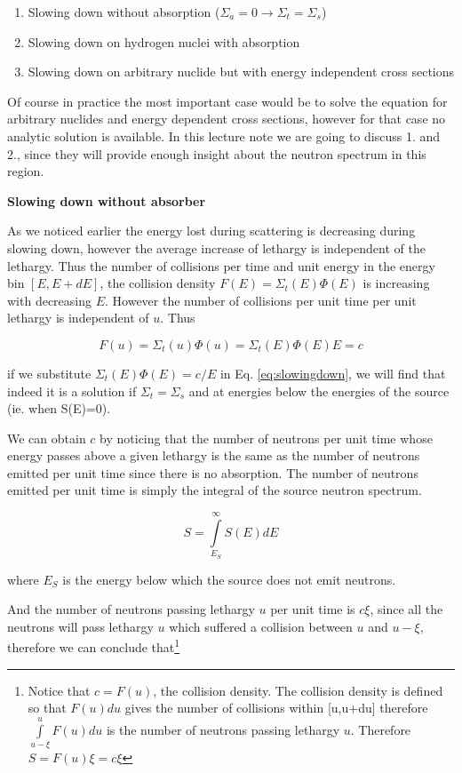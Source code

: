 \begin{enumerate}
\item Slowing down without absorption ($\Sigma_a=0 \rightarrow \Sigma_t=\Sigma_s$)
\item Slowing down on hydrogen nuclei with absorption
\item Slowing down on arbitrary nuclide but with energy independent cross sections
\end{enumerate}

Of course in practice the most important case would be to solve the equation for arbitrary nuclides and energy dependent cross sections, however for that case no analytic solution is available. In this lecture note we are going to discuss 1. and 2., since they will provide enough insight about the neutron spectrum in this region.

\vspace{0.5cm}

\textbf{Slowing down without absorber}

As we noticed earlier the energy lost during scattering is decreasing during slowing down, however the average increase of lethargy is independent of the lethargy. Thus the number of collisions per time and unit energy in the energy bin $[E,E+dE]$, the collision density $F(E)=\Sigma_t(E)\Phi(E)$ is increasing with decreasing $E$. However the number of collisions per unit time per unit lethargy is independent of $u$. Thus

$$F(u)=\Sigma_t(u)\Phi(u)=\Sigma_t(E)\Phi(E)E=c$$

\noindent if we substitute $\Sigma_t(E)\Phi(E)=c/E$ in Eq. \eqref{eq:slowingdown}, we will find that indeed it is a solution if $\Sigma_t=\Sigma_s$ and at energies below the energies of the source (ie. when S(E)=0).

We can obtain $c$ by noticing that the number of neutrons per unit time whose energy passes above a given lethargy is the same as the number of neutrons emitted per unit time since there is no absorption. The number of neutrons emitted per unit time is simply the integral of the source neutron spectrum.

$$S=\int\limits_{E_S}^\infty S(E)dE$$

\noindent where $E_S$ is the energy below which the source does not emit neutrons. 

And the number of neutrons passing lethargy $u$ per unit time is $c\xi$, since all the neutrons will pass lethargy $u$ which suffered a collision between $u$ and $u-\xi$, therefore we can conclude that\footnote{Notice that $c=F(u)$, the collision density. The collision density is defined so that $F(u)du$ gives the number of collisions within [u,u+du] therefore $\int\limits_{u-\xi}^u F(u)du$ is the number of neutrons passing lethargy $u$. Therefore $S=F(u)\xi=c\xi$ }

